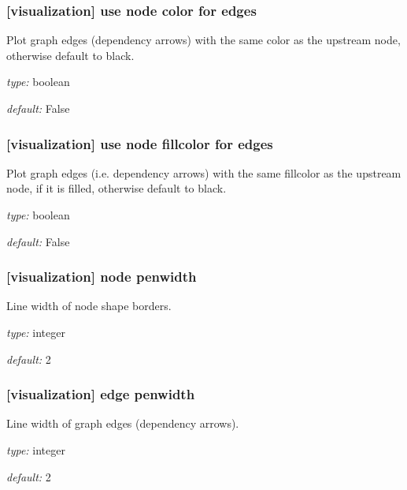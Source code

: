 \subsubsection[use node color for edges]{[visualization] \textrightarrow use node color for edges}

Plot graph edges (dependency arrows) with the same color as the upstream
node, otherwise default to black.

\begin{myitemize}
    \item {\em type:} boolean
    \item {\em default:} False
\end{myitemize}

\subsubsection[use node fillcolor for edges]{[visualization] \textrightarrow use node fillcolor for edges}

Plot graph edges (i.e. dependency arrows) with the same fillcolor as the
upstream node, if it is filled, otherwise default to black.

\begin{myitemize}
    \item {\em type:} boolean
    \item {\em default:} False
\end{myitemize}

\subsubsection[node penwidth]{[visualization] \textrightarrow node penwidth}

Line width of node shape borders.

\begin{myitemize}
    \item {\em type:} integer
    \item {\em default:} 2
\end{myitemize}

\subsubsection[edge penwidth]{[visualization] \textrightarrow edge penwidth}

Line width of graph edges (dependency arrows).

\begin{myitemize}
    \item {\em type:} integer
    \item {\em default:} 2
\end{myitemize}

